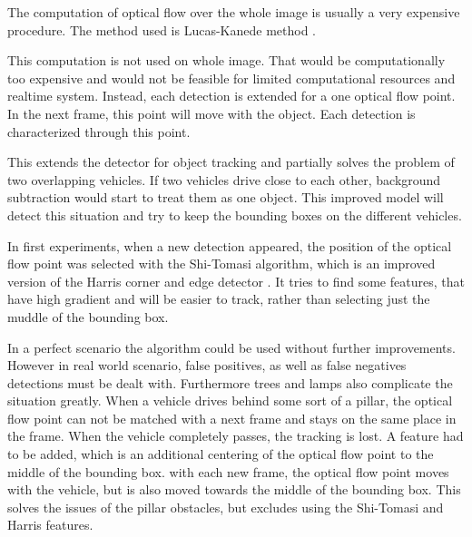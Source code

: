 \documentclass[a4paper,12pt,titlepage, twoside]{article}
\numberwithin{figure}{section}
\begin{document}
The computation of optical flow over the whole image is usually a very expensive procedure. The method used is Lucas-Kanede method \cite{lucas-kanede}. 

This computation is not used on whole image. That would be computationally too expensive and would not be feasible for limited computational resources and realtime system. Instead, each detection is extended for a one optical flow point. In the next frame, this point will move with the object. Each detection is characterized through this point. 

This extends the detector for object tracking and partially solves the problem of two overlapping vehicles. If two vehicles drive close to each other, background subtraction would start to treat them as one object. This improved model will detect this situation and try to keep the bounding boxes on the different vehicles. 

In first experiments, when a new detection appeared, the position of the optical flow point was selected with the Shi-Tomasi \cite{shi-tomasi} algorithm, which is an improved version of the Harris corner and edge detector \cite{harris}. It tries to find some features, that have high gradient and will be easier to track, rather than selecting just the muddle of the bounding box.

In a perfect scenario the algorithm could be used without further improvements. However in real world scenario, false positives, as well as false negatives detections must be dealt with. Furthermore trees and lamps also complicate the situation greatly. When a vehicle drives behind some sort of a pillar, the optical flow point can not be matched with a next frame and stays on the same place in the frame. When the vehicle completely passes, the tracking is lost. A feature had to be added, which is an additional centering of the optical flow point to the middle of the bounding box. with each new frame, the optical flow point moves with the vehicle, but is also moved towards the middle of the bounding box. This solves the issues of the pillar obstacles, but excludes using the Shi-Tomasi and Harris features. 
\end{document}
